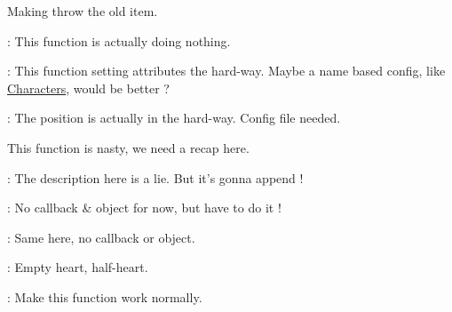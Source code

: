 
\begin{DoxyRefList}
\item[\label{todo__todo000001}%
\hypertarget{todo__todo000001}{}%
Member \hyperlink{class_characters_aee824830a67177342ae606f959fb0c7a}{Characters\-:\-:\-\_\-pickup\-Item} (int status)]Making throw the old item.  
\item[\label{todo__todo000003}%
\hypertarget{todo__todo000003}{}%
Member \hyperlink{class_consumable_adb866e69c3796edffad832b88e527518}{Consumable\-:\-:Begin\-Contact} (\hyperlink{class_elements}{Elements} $\ast$elem, b2\-Contact $\ast$contact)]\-: This function is actually doing nothing.  
\item[\label{todo__todo000002}%
\hypertarget{todo__todo000002}{}%
Member \hyperlink{class_consumable_ae374944f6333618dd08318b98b6950c7}{Consumable\-:\-:Consumable} ()]\-: This function setting attributes the hard-\/way. Maybe a name based config, like \hyperlink{class_characters}{Characters}, would be better ?  
\item[\label{todo__todo000004}%
\hypertarget{todo__todo000004}{}%
Member \hyperlink{class_equipment_a2bd67c4254f2074f4f7469f29a20e760}{Equipment\-:\-:Equipment} ()]\-: The position is actually in the hard-\/way. Config file needed.  
\item[\label{todo__todo000005}%
\hypertarget{todo__todo000005}{}%
Member \hyperlink{class_game_a194dbc017575c98bda4e2317d266a67e}{Game\-:\-:display\-H\-U\-D} (void)]This function is nasty, we need a recap here.  
\item[\label{todo__todo000007}%
\hypertarget{todo__todo000007}{}%
Member \hyperlink{class_h_u_d_window_a1c6965adb9fdd22b230d20b26fef5ac0}{H\-U\-D\-Window\-:\-:armor} (void)]\-: The description here is a lie. But it's gonna append !  
\item[\label{todo__todo000008}%
\hypertarget{todo__todo000008}{}%
Member \hyperlink{class_h_u_d_window_acd4fdbfd1c2562384b84d3bcda80fea1}{H\-U\-D\-Window\-:\-:boots} (void)]\-: No callback \& object for now, but have to do it !  
\item[\label{todo__todo000009}%
\hypertarget{todo__todo000009}{}%
Member \hyperlink{class_h_u_d_window_a378bc8269cacb151f68cfb37114e0c38}{H\-U\-D\-Window\-:\-:consumable} (void)]\-: Same here, no callback or object.  
\item[\label{todo__todo000006}%
\hypertarget{todo__todo000006}{}%
Member \hyperlink{class_h_u_d_window_a8fc917fbfae792d046e90448c963100a}{H\-U\-D\-Window\-:\-:life} (int l)]\-: Empty heart, half-\/heart.  
\item[\label{todo__todo000010}%
\hypertarget{todo__todo000010}{}%
Member \hyperlink{class_h_u_d_window_a8264836f3c55d8211f4e5166e9049628}{H\-U\-D\-Window\-:\-:minimap} (void)]\-: Make this function work normally. 
\end{DoxyRefList}